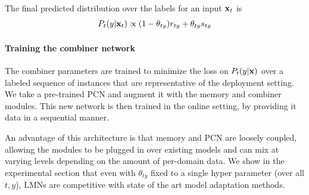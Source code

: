 \documentclass[letterpaper]{article} %
\newcommand{\vek}[1]{{\bf {#1}}}
\newcommand{\vx}{{\vek{x}}}
\newcommand{\lmm}{{s}}
\begin{document}
The final predicted distribution over the labels for an input $\vx_t$ is
\begin{equation}
\label{eq:overall}
P_t(y|\vx_t) \propto  (1-\theta_{ty})r_{ty} + \theta_{ty} \lmm_{ty}
\end{equation}

\paragraph{Training the combiner network} The combiner parameters are trained to minimize the loss on $P_t(y|\vx)$ over a labeled sequence of instances that are representative of the deployment setting.
We take a pre-trained PCN and augment it with the memory and combiner modules. This new network is then trained in the online setting, by providing it data in a sequential manner.

An advantage of this architecture is that memory and PCN are loosely coupled, allowing the modules to be plugged in over existing models and can mix at varying levels depending on the amount of per-domain data. We show in the experimental section that even with $\theta_{ty}$ fixed to a single hyper parameter (over all $t,y$), LMNs are competitive with state of the art model adaptation methods.
\end{document}
